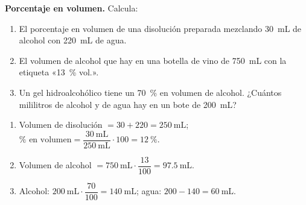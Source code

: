 \begin{exercise}
    \textbf{Porcentaje en volumen.} Calcula:
    \begin{enumerate}[label=\letraminuscula]
        \item El porcentaje en volumen de una disolución preparada mezclando \qty{30}{\mL} de alcohol con \qty{220}{\mL} de agua.
        \item El volumen de alcohol que hay en una botella de vino de \qty{750}{\mL} con la etiqueta «\qty{13}{\percent} vol.».
        \item Un gel hidroalcohólico tiene un \qty{70}{\percent} en volumen de alcohol. ¿Cuántos mililitros de alcohol y de agua hay en un bote de \qty{200}{\mL}?
    \end{enumerate}
    \begin{solu}
        \begin{enumerate}[label=\alph*)]
            \item Volumen de disolución \(= 30 + 220 = \qty{250}{\mL}\); \(\%\text{ en volumen} = \dfrac{\qty{30}{\mL}}{\qty{250}{\mL}} \cdot 100 = \qty{12}{\percent}\).
            \item Volumen de alcohol \(= \qty{750}{\mL} \cdot \dfrac{13}{100} = \qty{97.5}{\mL}\).
            \item Alcohol: \(\qty{200}{\mL} \cdot \dfrac{70}{100} = \qty{140}{\mL}\); agua: \(200 - 140 = \qty{60}{\mL}\).
        \end{enumerate}
    \end{solu}
\end{exercise}




